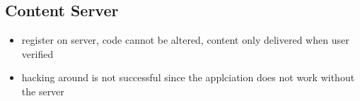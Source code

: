 \subsection{Content Server} \label{section:counter-replace-server}
\begin{itemize}
  \item register on server, code cannot be altered, content only delivered when user verified
  \item hacking around is not successful since the applciation does not work without the server
\end{itemize}
